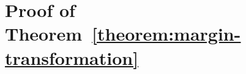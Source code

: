 \section{Proof of Theorem~\ref{theorem:margin-transformation}}
\label{section:proof-of-theorem-margin-transformation}



